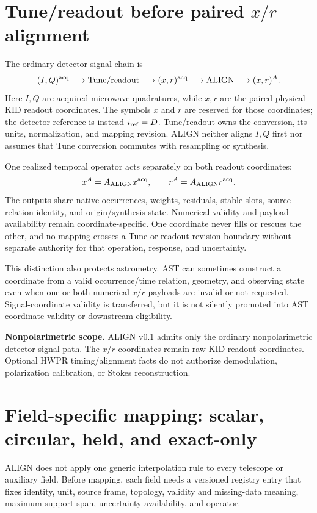 \documentclass[10pt]{article}
\newcommand{\statusbox}[1]{\par\smallskip\noindent\colorbox{aligngray}{\parbox{0.96\linewidth}{#1}}\par\smallskip}
\begin{document}
\clearpage
\section{Tune/readout before paired \(x/r\) alignment}

The ordinary detector-signal chain is
\[
 (I,Q)^{\rm acq}\longrightarrow\text{Tune/readout}
 \longrightarrow(x,r)^{\rm acq}\longrightarrow\text{ALIGN}
 \longrightarrow(x,r)^A .
\]
Here \(I,Q\) are acquired microwave quadratures, while \(x,r\) are the paired
physical KID readout coordinates.  The symbols \(x\) and \(r\) are reserved
for those coordinates; the detector reference is instead \(i_{\rm ref}=D\).
Tune/readout owns the conversion, its units, normalization, and mapping
revision.  ALIGN neither aligns \(I,Q\) first nor assumes that Tune conversion
commutes with resampling or synthesis.

One realized temporal operator acts separately on both readout coordinates:
\[
 x^A=A_{\rm ALIGN}x^{\rm acq},\qquad
 r^A=A_{\rm ALIGN}r^{\rm acq}.
\]
The outputs share native occurrences, weights, residuals, stable slots,
source-relation identity, and origin/synthesis state.  Numerical validity and
payload availability remain coordinate-specific.  One coordinate never fills
or rescues the other, and no mapping crosses a Tune or readout-revision
boundary without separate authority for that operation, response, and
uncertainty.

This distinction also protects astrometry.  AST can sometimes construct a
coordinate from a valid occurrence/time relation, geometry, and observing
state even when one or both numerical \(x/r\) payloads are invalid or not
requested.  Signal-coordinate validity is transferred, but it is not silently
promoted into AST coordinate validity or downstream eligibility.

\statusbox{\textbf{Nonpolarimetric scope.} ALIGN v0.1 admits only the ordinary
nonpolarimetric detector-signal path.  The \(x/r\) coordinates remain raw KID
readout coordinates.  Optional HWPR timing/alignment facts do not authorize
demodulation, polarization calibration, or Stokes reconstruction.}

\clearpage
\section{Field-specific mapping: scalar, circular, held, and exact-only}

ALIGN does not apply one generic interpolation rule to every telescope or
auxiliary field.  Before mapping, each field needs a versioned registry entry
that fixes identity, unit, source frame, topology, validity and missing-data
meaning, maximum support span, uncertainty availability, and operator.
\end{document}
